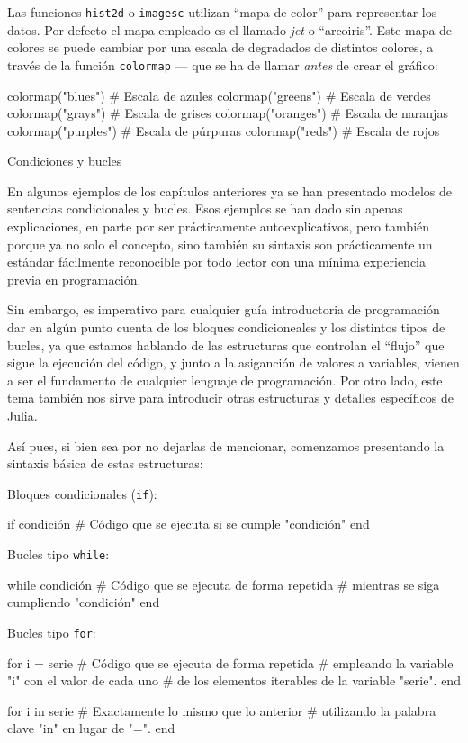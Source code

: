 ﻿\documentclass{article}
\newcommand{\code}{\texttt}
\begin{document}
Las funciones \code{hist2d} o \code{imagesc} utilizan ``mapa de color'' para representar los datos. Por defecto el mapa empleado es el llamado \emph{jet} o ``arcoiris''. Este mapa de colores se puede cambiar por una escala de degradados de distintos colores, a través de la función \code{colormap} --- que se ha de llamar \emph{antes} de crear el gráfico:

colormap("blues")   # Escala de azules
colormap("greens")  # Escala de verdes
colormap("grays")   # Escala de grises
colormap("oranges") # Escala de naranjas
colormap("purples") # Escala de púrpuras
colormap("reds")    # Escala de rojos


Condiciones y bucles

En algunos ejemplos de los capítulos anteriores ya se han presentado modelos de sentencias condicionales y bucles. Esos ejemplos se han dado sin apenas explicaciones, en parte por ser prácticamente autoexplicativos, pero también porque ya no solo el concepto, sino también su sintaxis son prácticamente un estándar fácilmente reconocible por todo lector con una mínima experiencia previa en programación.

Sin embargo, es imperativo para cualquier guía introductoria de programación dar en algún punto cuenta de los bloques condicioneales y los distintos tipos de bucles, ya que estamos hablando de las estructuras que controlan el ``flujo'' que sigue la ejecución del código, y junto a la asiganción de valores a variables, vienen a ser el fundamento de cualquier lenguaje de programación. Por otro lado, este tema también nos sirve para introducir otras estructuras y detalles específicos de Julia.

Así pues, si bien sea por no dejarlas de mencionar, comenzamos presentando la sintaxis básica de estas estructuras:

Bloques condicionales (\code{if}):

if condición
  # Código que se ejecuta si se cumple "condición"
end

Bucles tipo \code{while}:

while condición
  # Código que se ejecuta de forma repetida
  # mientras se siga cumpliendo "condición"
end

Bucles tipo \code{for}:

for i = serie
  # Código que se ejecuta de forma repetida
  # empleando la variable "i" con el valor de cada uno
  # de los elementos iterables de la variable "serie".
end

for i in serie
  # Exactamente lo mismo que lo anterior
  # utilizando la palabra clave "in" en lugar de "=".
end
\end{document}
